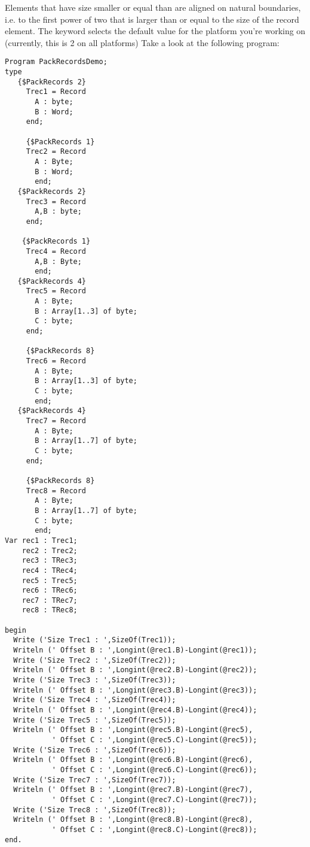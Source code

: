 \documentclass{report}
\begin{document}
Elements that have size smaller or equal than  are aligned on
natural boundaries, i.e. to the first power of two that is larger than or
equal to the size of the record element.
The keyword  selects the default value for the platform
you're working on (currently, this is 2 on all platforms)
Take a look at the following program:
\begin{verbatim}
Program PackRecordsDemo;
type
   {$PackRecords 2}
     Trec1 = Record
       A : byte;
       B : Word;
     end;

     {$PackRecords 1}
     Trec2 = Record
       A : Byte;
       B : Word;
       end;
   {$PackRecords 2}
     Trec3 = Record
       A,B : byte;
     end;

    {$PackRecords 1}
     Trec4 = Record
       A,B : Byte;
       end;
   {$PackRecords 4}
     Trec5 = Record
       A : Byte;
       B : Array[1..3] of byte;
       C : byte;
     end;

     {$PackRecords 8}
     Trec6 = Record
       A : Byte;
       B : Array[1..3] of byte;
       C : byte;
       end;
   {$PackRecords 4}
     Trec7 = Record
       A : Byte;
       B : Array[1..7] of byte;
       C : byte;
     end;

     {$PackRecords 8}
     Trec8 = Record
       A : Byte;
       B : Array[1..7] of byte;
       C : byte;
       end;
Var rec1 : Trec1;
    rec2 : Trec2;
    rec3 : TRec3;
    rec4 : TRec4;
    rec5 : Trec5;
    rec6 : TRec6;
    rec7 : TRec7;
    rec8 : TRec8;

begin
  Write ('Size Trec1 : ',SizeOf(Trec1));
  Writeln (' Offset B : ',Longint(@rec1.B)-Longint(@rec1));
  Write ('Size Trec2 : ',SizeOf(Trec2));
  Writeln (' Offset B : ',Longint(@rec2.B)-Longint(@rec2));
  Write ('Size Trec3 : ',SizeOf(Trec3));
  Writeln (' Offset B : ',Longint(@rec3.B)-Longint(@rec3));
  Write ('Size Trec4 : ',SizeOf(Trec4));
  Writeln (' Offset B : ',Longint(@rec4.B)-Longint(@rec4));
  Write ('Size Trec5 : ',SizeOf(Trec5));
  Writeln (' Offset B : ',Longint(@rec5.B)-Longint(@rec5),
           ' Offset C : ',Longint(@rec5.C)-Longint(@rec5));
  Write ('Size Trec6 : ',SizeOf(Trec6));
  Writeln (' Offset B : ',Longint(@rec6.B)-Longint(@rec6),
           ' Offset C : ',Longint(@rec6.C)-Longint(@rec6));
  Write ('Size Trec7 : ',SizeOf(Trec7));
  Writeln (' Offset B : ',Longint(@rec7.B)-Longint(@rec7),
           ' Offset C : ',Longint(@rec7.C)-Longint(@rec7));
  Write ('Size Trec8 : ',SizeOf(Trec8));
  Writeln (' Offset B : ',Longint(@rec8.B)-Longint(@rec8),
           ' Offset C : ',Longint(@rec8.C)-Longint(@rec8));
end.
\end{verbatim}
\end{document}
